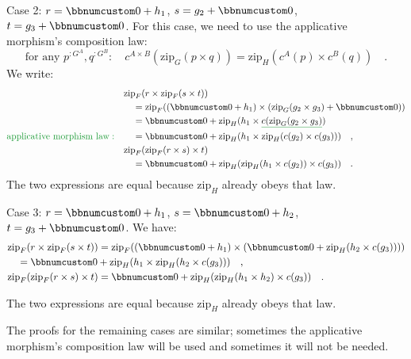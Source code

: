 Case 2: $r=\bbnum 0+h_{1}$, $s=g_{2}+\bbnum 0$, $t=g_{3}+\bbnum 0$.
For this case, we need to use the applicative morphism\textsf{'}s composition
law:
\[
\text{for any }p^{:G^{A}},q^{:G^{B}}:\quad c^{A\times B}(\text{zip}_{G}(p\times q))=\text{zip}_{H}(c^{A}(p)\times c^{B}(q))\quad.
\]
 We write:
\begin{align*}
 & \text{zip}_{F}(r\times\text{zip}_{F}(s\times t))\\
 & \quad=\text{zip}_{F}((\bbnum 0+h_{1})\times(\text{zip}_{G}(g_{2}\times g_{3})+\bbnum 0))\\
 & \quad=\bbnum 0+\text{zip}_{H}(h_{1}\times\gunderline{c(\text{zip}_{G}(g_{2}\times g_{3})})\\
{\color{greenunder}\text{applicative morphism law}:}\quad & \quad=\bbnum 0+\text{zip}_{H}(h_{1}\times\text{zip}_{H}(c(g_{2})\times c(g_{3})))\quad,\\
 & \text{zip}_{F}(\text{zip}_{F}(r\times s)\times t)\\
 & \quad=\bbnum 0+\text{zip}_{H}(\text{zip}_{H}(h_{1}\times c(g_{2}))\times c(g_{3}))\quad.
\end{align*}
The two expressions are equal because $\text{zip}_{H}$ already obeys
that law.

Case 3: $r=\bbnum 0+h_{1}$, $s=\bbnum 0+h_{2}$, $t=g_{3}+\bbnum 0$.
We have:
\begin{align*}
 & \text{zip}_{F}(r\times\text{zip}_{F}(s\times t))=\text{zip}_{F}((\bbnum 0+h_{1})\times(\bbnum 0+\text{zip}_{H}(h_{2}\times c(g_{3}))))\\
 & \quad=\bbnum 0+\text{zip}_{H}(h_{1}\times\text{zip}_{H}(h_{2}\times c(g_{3})))\quad,\\
 & \text{zip}_{F}(\text{zip}_{F}(r\times s)\times t)=\bbnum 0+\text{zip}_{H}(\text{zip}_{H}(h_{1}\times h_{2})\times c(g_{3}))\quad.
\end{align*}

The two expressions are equal because $\text{zip}_{H}$ already obeys
that law.

The proofs for the remaining cases are similar; sometimes the applicative
morphism\textsf{'}s composition law will be used and sometimes it will not
be needed.

